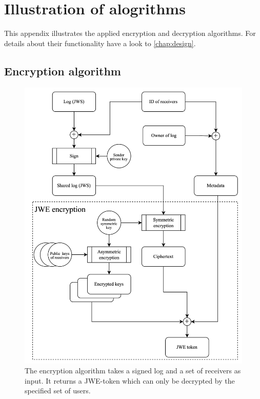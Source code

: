 \documentclass[../main.tex]{subfiles}
\begin{document}
\chapter{Illustration of alogrithms}

This appendix illustrates the applied encryption and decryption algorithms.
For details about their functionality have a look to \cref{chap:design}.

\section{Encryption algorithm}
\label{app:encryption}
\begin{figure}[h]
    \includegraphics[scale=0.158]{../img/05/encrypt_logs.png}
    \centering
    \caption[Encryption algorithm]{The encryption algorithm takes a signed log and a set of receivers as input. It returns a JWE-token which can only be decrypted by the specified set of users.}
    \label{app:encryption_algo}
\end{figure}
\newpage
\end{document}
